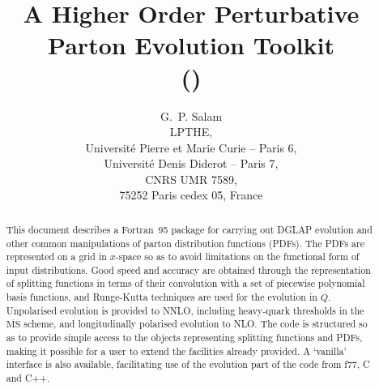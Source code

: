 \documentclass[12pt]{article}
\title{A Higher Order Perturbative Parton Evolution Toolkit \\
(\hoppet)
}
\author{G.~P. Salam\\[3pt]
  LPTHE,   \\Universit\'e Pierre et Marie Curie -- Paris 6,\\
  Universit\'e Denis Diderot -- Paris 7,\\
  CNRS UMR 7589,\\ 75252 Paris cedex 05, France}
\date{}
\newcommand{\MSbar}{\overline{\mathrm{MS}}}
\begin{document}
\maketitle 

\begin{abstract}
  This document describes a Fortran~95 package for carrying out DGLAP
  evolution and other common manipulations of parton distribution
  functions (PDFs). The PDFs are represented on a grid in $x$-space so
  as to avoid limitations on the functional form of input
  distributions.  Good speed and accuracy are obtained through the
  representation of splitting functions in terms of their convolution
  with a set of piecewise polynomial basis functions, and Runge-Kutta
  techniques are used for the evolution in $Q$.  Unpolarised evolution
  is provided to NNLO, including heavy-quark thresholds in the
  $\MSbar$ scheme, and longitudinally polarised evolution to NLO. The
  code is structured so as to provide simple access to the objects
  representing splitting functions and PDFs, making it possible for a
  user to extend the facilities already provided.
%
  A `vanilla' interface is also available, facilitating use of the
  evolution part of the code from f77, C and C++.  \smallskip

\end{abstract}

\newpage


\\
\end{document}
